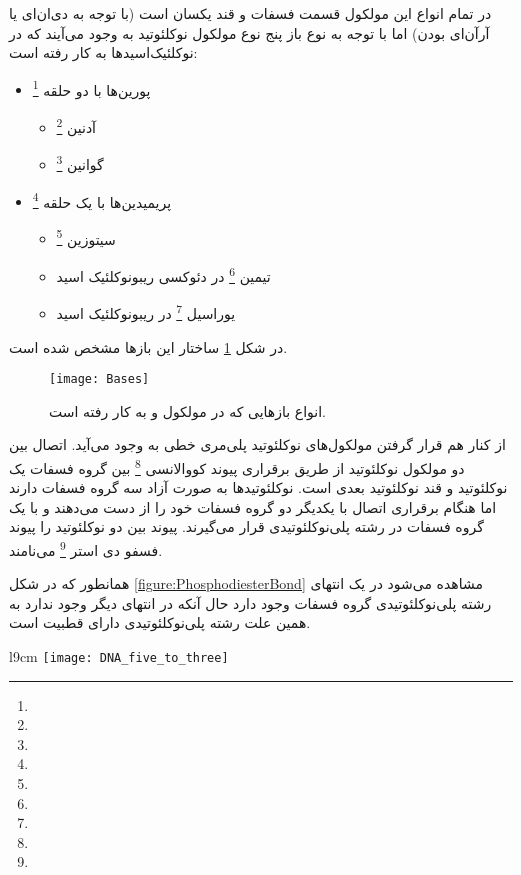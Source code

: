 در تمام انواع این مولکول قسمت فسفات و قند یکسان است (با توجه به دی‌ان‌ای یا آرآن‌ای بودن) اما با توجه به نوع باز پنج نوع مولکول نوکلئوتید به وجود می‌آیند که در نوکلئیک‌اسید‌ها
به کار رفته است:
\begin{itemize}
\item پورین‌ها با دو حلقه
\footnote{}
	\begin{itemize}
	\item آدنین
	\footnote{}
	\item گوانین
	\footnote{}
	\end{itemize}
\item پریمیدین‌ها با یک حلقه
\footnote{}
	\begin{itemize}
	\item سیتوزین
	\footnote{}
	\item تیمین
	\footnote{}
	در دئوکسی ریبونوکلئیک اسید	
	\item یوراسیل
	\footnote{}
در ریبونوکلئیک اسید
	\end{itemize}
\end{itemize}

\noindent
در شکل
\ref{figure:bases}
ساختار این باز‌ها مشخص شده است.

\begin{figure}[ht]
	\centering
	\texttt{[image: Bases]}
	\caption{انواع باز‌هایی که در مولکول
	و
	به کار رفته است.	
	}
	 \label{figure:bases}
\end{figure}

از کنار هم قرار گرفتن مولکول‌های نوکلئوتید پلی‌مری خطی به وجود می‌‌آيد. اتصال بین دو مولکول نوکلئوتید از طریق برقراری پیوند کووالانسی
\footnote{}
بین گروه فسفات یک نوکلئوتید و قند نوکلئوتید بعدی است. نوکلئوتید‌ها به صورت آزاد سه گروه فسفات دارند اما هنگام برقراری اتصال با یکدیگر دو گروه فسفات خود را از دست می‌دهند و با یک گروه فسفات در رشته پلی‌نوکلئوتیدی قرار می‌گیرند. پیوند بین دو نوکلئوتید را پیوند فسفو دی استر
\footnote{}
می‌نامند.

همانطور که در شکل
\ref{figure:PhosphodiesterBond}
مشاهده می‌شود در یک انتهای رشته پلی‌نوکلئوتیدی گروه فسفات وجود دارد حال آنکه در انتهای دیگر وجود ندارد به همین علت رشته پلی‌نوکلئوتیدی دارای قطبیت است.

\pagebreak
\begin{wrapfigure}[22]{l}{9cm}
	\centering
	\texttt{[image: DNA\_five\_to\_three]}
	\caption{
	پیوند فسفودی‌استری
	\protect	
	\footnote{}
	بین  گروه فسفات متصل به کربن
	$ 5^\prime $
	یک نوکلئوتید و گروه هیدروکسیل
	\protect
	\footnote{}
	نوکلئوتید بعدی برقرار می‌شود.	
	}
	\label{figure:PhosphodiesterBond}
\end{wrapfigure}

